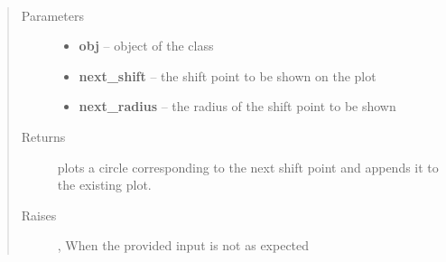 \documentclass[letterpaper,10pt,english]{sphinxmanual}
\begin{document}
\begin{fulllineitems}
\label{index:brake.solve.cover.draw_circles}~\begin{quote}\begin{description}
\item[{Parameters}] \leavevmode\begin{itemize}
\item {} 
\textbf{obj} -- object of the class 

\item {} 
\textbf{next\_shift} -- the shift point to be shown on the plot

\item {} 
\textbf{next\_radius} -- the radius of the shift point to be shown

\end{itemize}

\item[{Returns}] \leavevmode
plots a circle corresponding to the next shift point and appends it to the existing plot.

\item[{Raises }] \leavevmode
{}, When the provided input is not as expected

\end{description}\end{quote}

\end{fulllineitems}

\end{document}

